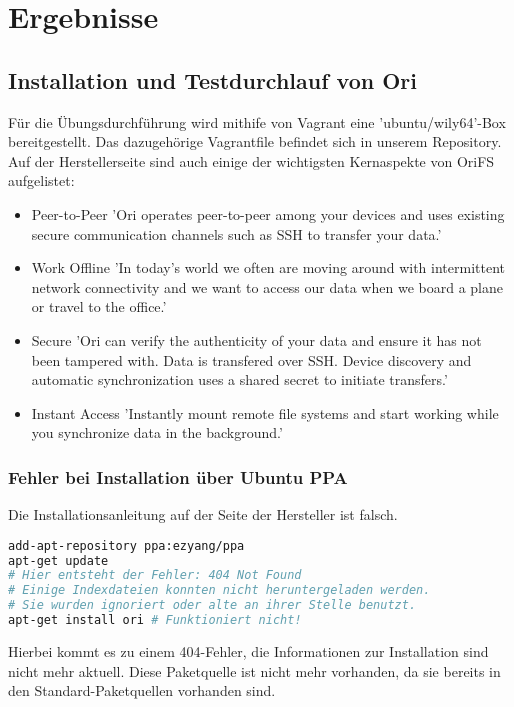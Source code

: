 
\section{Ergebnisse}
\label{sec:Ergebnisse}

\subsection{Installation und Testdurchlauf von Ori}
\label{subsec:Installation und Testdurchlauf von Ori}
Für die Übungsdurchführung wird mithife von Vagrant eine 'ubuntu/wily64'-Box bereitgestellt. Das dazugehörige Vagrantfile befindet sich in unserem Repository. \cite{repo} Auf der Herstellerseite sind auch einige der wichtigsten Kernaspekte von OriFS aufgelistet: 

\begin{itemize}
	\item Peer-to-Peer \newline
	'Ori operates peer-to-peer among your devices and uses existing secure communication channels such as SSH to transfer your data.'
	\item Work Offline \newline
	'In today's world we often are moving around with intermittent network connectivity and we want to access our data when we board a plane or travel to the office.'
	\item Secure \newline
	'Ori can verify the authenticity of your data and ensure it has not been tampered with. Data is transfered over SSH. Device discovery and automatic synchronization uses a shared secret to initiate transfers.'
	\item Instant Access \newline
	'Instantly mount remote file systems and start working while you synchronize data in the background.' \cite{OrifsStanford}
\end{itemize}

\subsubsection{Fehler bei Installation über Ubuntu PPA}
\label{subsubsec:Fehler bei Installation über Ubuntu PPA}
Die Installationsanleitung auf der Seite der Hersteller \cite{OrifsStanford} ist falsch. \newline
\begin{lstlisting}[frame=single, language=bash, caption=Anleitung zur Installation laut Hersteller - fehlerhaft]
add-apt-repository ppa:ezyang/ppa
apt-get update
# Hier entsteht der Fehler: 404 Not Found
# Einige Indexdateien konnten nicht heruntergeladen werden. 
# Sie wurden ignoriert oder alte an ihrer Stelle benutzt.
apt-get install ori # Funktioniert nicht!
\end{lstlisting}
Hierbei kommt es zu einem 404-Fehler, die Informationen zur Installation sind nicht mehr aktuell. Diese Paketquelle ist nicht mehr vorhanden, da sie bereits in den Standard-Paketquellen vorhanden sind.

